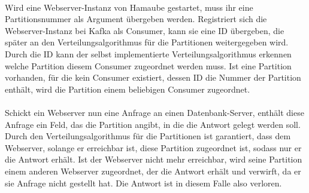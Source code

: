 \\
Wird eine Webserver-Instanz von Hamaube gestartet, muss ihr eine Partitionsnummer als Argument übergeben werden. Registriert sich die Webserver-Instanz bei Kafka als Consumer, kann sie eine ID übergeben, die später an den Verteilungsalgorithmus für die Partitionen weitergegeben wird. Durch die ID kann der selbst implementierte Verteilungsalgorithmus erkennen welche Partition diesem Consumer zugeordnet werden muss. Ist eine Partition vorhanden, für die kein Consumer existiert, dessen ID die Nummer der Partition enthält, wird die Partition einem beliebigen Consumer zugeordnet.\\
\\
Schickt ein Webserver nun eine Anfrage an einen Datenbank-Server, enthält diese Anfrage ein Feld, das die Partition angibt, in die die Antwort gelegt werden soll. Durch den Verteilungsalgorithmus für die Partitionen ist garantiert, dass dem Webserver, solange er erreichbar ist, diese Partition zugeordnet ist, sodass nur er die Antwort erhält. Ist der Webserver nicht mehr erreichbar, wird seine Partition einem anderen Webserver zugeordnet, der die Antwort erhält und verwirft, da er sie Anfrage nicht gestellt hat. Die Antwort ist in diesem Falle also verloren.
